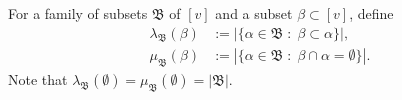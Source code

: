 \documentclass[11pt]{article}
\newtheorem{remark}[theorem]{Remark}
\begin{document}

For a family of subsets $\mathfrak B$ of $[v]$ and a subset $\beta\subset[v]$, define 
\begin{align*}
\lambda_\mathfrak B(\beta)&:=|\{\alpha \in \mathfrak B  \; : \;  \beta \subset \alpha\}|,\\
\mu_\mathfrak B(\beta)&:=|\{\alpha \in \mathfrak B  \; : \;  \beta \cap \alpha=\emptyset\}|. 
\end{align*}
Note that $\lambda_\mathfrak B(\emptyset) = \mu_\mathfrak B(\emptyset)=|\mathfrak B|$. 

\end{document}
